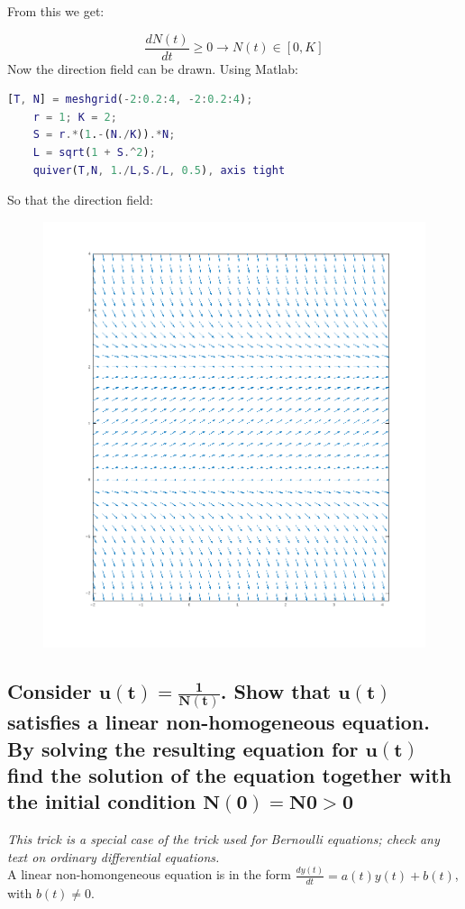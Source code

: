   From this we get:

  $$\frac{dN(t)}{dt}\ge 0\rightarrow N(t)\in[0,K]$$
  Now the direction field can be drawn.
  Using Matlab:

  \begin{lstlisting}[language=Matlab]
    [T, N] = meshgrid(-2:0.2:4, -2:0.2:4);
    r = 1; K = 2;
    S = r.*(1.-(N./K)).*N;
    L = sqrt(1 + S.^2);
    quiver(T,N, 1./L,S./L, 0.5), axis tight
  \end{lstlisting}

  So that the direction field:

  \begin{figure}[H]
    \centering
    \includegraphics[width=\textwidth/2]{01_direction_field}
  \end{figure}

  \subsection{Consider $\mathbf{u(t) = \frac{1}{N(t)}}$. Show that $\mathbf{u(t)}$ satisfies a linear non-homogeneous equation. By solving the resulting equation for $\mathbf{u(t)}$ find the solution of the equation together with the initial condition $\mathbf{N(0) = N0 > 0}$}
  \textit{This trick is a special case of the trick used for Bernoulli equations; check any text on ordinary differential equations.}\\
  A linear non-homongeneous equation is in the form $\frac{dy(t)}{dt} = a(t)y(t)+b(t)$, with $b(t) \neq 0$.

